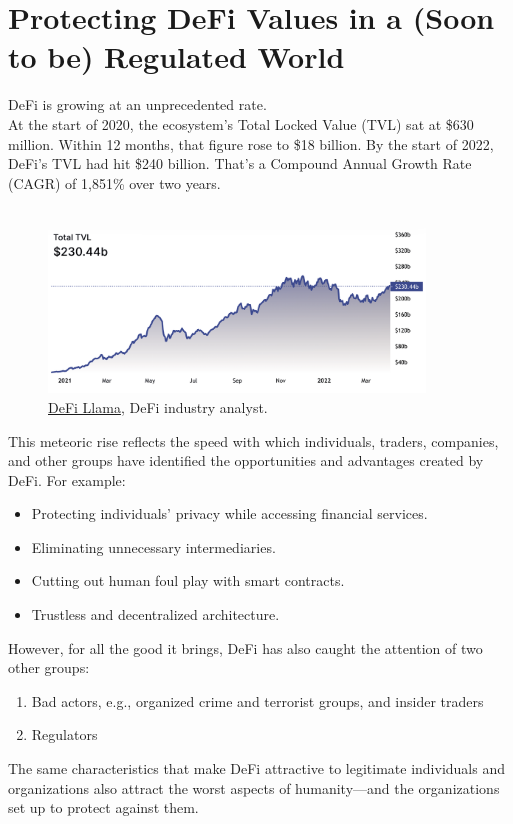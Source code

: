\section{Protecting DeFi Values in a (Soon to be) Regulated World}\label{sec:introduction}

DeFi is growing at an unprecedented rate.\\

At the start of 2020, the ecosystem’s Total Locked Value (TVL) sat at \$630 million. Within 12 months, that figure rose to \$18 billion. By the start of 2022, DeFi’s TVL had hit \$240 billion. That’s a Compound Annual Growth Rate (CAGR) of 1,851\% over two years.\\\\

\begin{figure}[h]
  \begin{center}
    \centering
    \includegraphics[width=100mm,scale=0.5]{figures/01-introduction-defi-lama.png}
    \caption[Fig 1]{\href{https://defillama.com/}{DeFi Llama}, DeFi industry analyst.\label{fig:defi-tvl}}
  \end{center}
\end{figure}

This meteoric rise reflects the speed with which individuals, traders, companies, and other groups have identified the opportunities and advantages created by DeFi. For example:
\begin{itemize}
\item Protecting individuals’ privacy while accessing financial services.
\item Eliminating unnecessary intermediaries.
\item Cutting out human foul play with smart contracts.
\item Trustless and decentralized architecture.
\end{itemize}

However, for all the good it brings, DeFi has also caught the attention of two other groups:
\begin{enumerate}
\item Bad actors, e.g., organized crime and terrorist groups, and insider traders
\item Regulators
\end{enumerate}
The same characteristics that make DeFi attractive to legitimate individuals and organizations also attract the worst aspects of humanity—and the organizations set up to protect against them.

